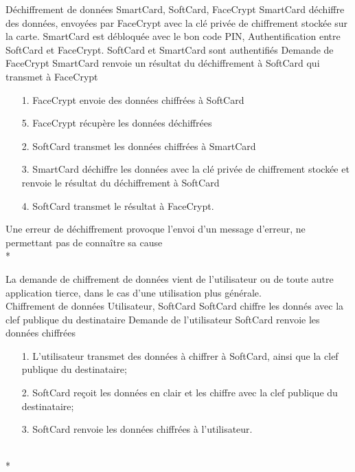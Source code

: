 \documentclass[a4paper,11pt,french]{article}
\begin{document}
\fiche
{Déchiffrement de données}
	{SmartCard, SoftCard, FaceCrypt}
    {SmartCard déchiffre des données, envoyées par FaceCrypt avec la clé privée
    de chiffrement stockée sur la carte.}
    {SmartCard est débloquée avec le bon code PIN, Authentification entre 
    SoftCard et FaceCrypt.  SoftCard et SmartCard sont authentifiés}
    {Demande de FaceCrypt}
    {SmartCard renvoie un résultat du déchiffrement à SoftCard qui transmet à 
    FaceCrypt}
    {\begin{itemize}
        \item[]        
        \item[1.] FaceCrypt envoie des données chiffrées à SoftCard
        \item[5.] FaceCrypt récupère les données déchiffrées
    \end{itemize}}
	{\begin{itemize}
        \item[]		
        \item[2.] SoftCard transmet les données chiffrées à SmartCard
	\item[3.] SmartCard déchiffre les données avec la clé privée de 
        chiffrement stockée et renvoie le résultat du déchiffrement à SoftCard
	\item[4.] SoftCard transmet le résultat à FaceCrypt.
	\end{itemize}
	}
	{}
\flots
    {}
    {Une erreur de déchiffrement provoque l'envoi d'un message d'erreur, ne
    permettant pas de connaître sa cause}
\\*

La demande de chiffrement de données vient de l'utilisateur ou de toute autre 
application tierce, dans le cas d'une utilisation plus générale.\\

\fiche
{Chiffrement de données}
	{Utilisateur, SoftCard}
    {SoftCard chiffre les donnés avec la clef publique du destinataire}
    {}
    {Demande de l'utilisateur}
    {SoftCard renvoie les données chiffrées}
    {\begin{itemize}
        \item[]
        \item[1.] L'utilisateur transmet des données à chiffrer à SoftCard,
            ainsi que la clef publique du destinataire;
    \end{itemize}}
	{\begin{itemize}
        \item[]
        \item[2.] SoftCard reçoit les données en clair et les chiffre 
        avec la clef publique du destinataire;
		\item[3.] SoftCard renvoie les données chiffrées à l'utilisateur.
	\end{itemize}
	}
	{}
\flots
    {}
    {}
\\*
\end{document}
